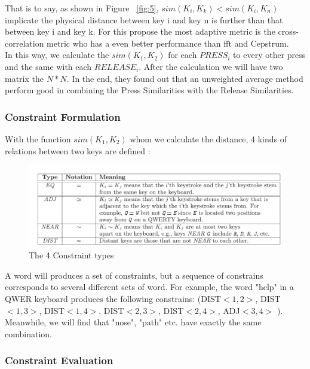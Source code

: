 \documentclass[12pt,a4paper]{article}
\begin{document}
That is to say, as shown in Figure ~\ref{fig:5}, $sim(K_{i},K_{k})<sim(K_{i},K_{n})$ implicate the physical distance between key i and key n is further than that between key i and key k. For this propose the most adaptive metric is the cross-correlation metric who has a even better performance than fft and Cepstrum.\\

In this way, we calculate the $sim(K_{1},K_{2})$ for each $PRESS_{i}$ to every other press and the same with each $RELEASE_{i}$. After the calculation we will have two matrix the $N*N$. In the end, they found out that an unweighted average method perform good in combining the Press Similarities with the Release Similarities.\\ 

\subsubsection{Constraint Formulation}

With the function $sim(K_{1},K_{2})$ whom we calculate the distance, 4 kinds of relations between two keys are defined : 
\begin{figure}[h]
\begin{center}
        \includegraphics[scale=0.45]{4ConstraintTypes.png}
        \caption{The 4 Constraint types}
        \label{fig:6}
\end{center}
\end{figure} \par
\FloatBarrier

A word will produces a set of constraints, but a sequence of constrains corresponds to several different sets of word. For example, the word "help" in a QWER keyboard produces the following constrains: (DIST$<1,2>$, DIST$<1,3>$, DIST$<1,4>$, DIST$<2,3>$, DIST$<2,4>$, ADJ$<3,4>$ ). Meanwhile, we will find that "nose", "path" etc. have exactly the same combination. \\

\subsubsection{Constraint Evaluation}
\end{document}
